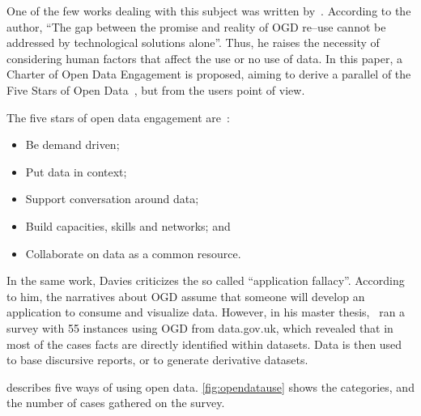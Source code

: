 One of the few works dealing with this subject was written by~. According to the author, ``The gap between the promise and reality of OGD re--use cannot be addressed by technological solutions alone''.
Thus, he raises the necessity of considering human factors that affect the use or no use of data.
In this paper, a Charter of Open Data Engagement is proposed, aiming to derive a parallel of the Five Stars of Open Data~\cite{Berners-Lee2010}, but from the users point of view.

The five stars of open data engagement are~\cite{Davies2012}:

\begin{itemize}
	\item Be demand driven;
	\item Put data in context;
	\item Support conversation around data;
	\item Build capacities, skills and networks; and
	\item Collaborate on data as a common resource.
\end{itemize}

In the same work, Davies criticizes the so called ``application fallacy''.
According to him, the narratives about OGD assume that someone will develop an application to consume and visualize data.
However, in his master thesis,~ ran a survey with 55 instances using OGD from data.gov.uk, which revealed that in most of the cases facts are directly identified within datasets.
Data is then used to base discursive reports, or to generate derivative datasets.

 describes five ways of using open data. 
\autoref{fig:opendatause} shows the categories, and the number of cases gathered on the survey.

